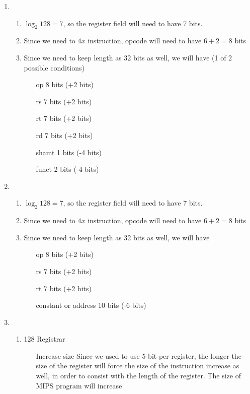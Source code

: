 \documentclass{article}
\def\math#1{$#1$}
\begin{document}
\begin{enumerate}[1)]
    \item \begin{enumerate}
        \item \math{\log_2 128 = 7}, so the register field will need to have 7 bits.
        \item Since we need to \math{4x} instruction, opcode will need to have \math{6 + 2 = 8} bits
        \item Since we need to keep length as 32 bits as well, we will have (1 of 2 possible conditions)
            \begin{itemize}
                \item [op] 8 bits (+2 bits)
                \item [rs] 7 bits (+2 bits)
                \item [rt] 7 bits (+2 bits)
                \item [rd] 7 bits (+2 bits)
                \item [shamt] 1 bits (-4 bits)
                \item [funct] 2 bits (-4 bits)
            \end{itemize}
        \end{enumerate}
    \item \begin{enumerate}
        \item \math{\log_2 128 = 7}, so the register field will need to have 7 bits.
        \item Since we need to \math{4x} instruction, opcode will need to have \math{6 + 2 = 8} bits
        \item Since we need to keep length as 32 bits as well, we will have 
            \begin{itemize}
                \item [op] 8 bits (+2 bits)
                \item [rs] 7 bits (+2 bits)
                \item [rt] 7 bits (+2 bits)
                \item [constant or address] 10 bits (-6 bits)
            \end{itemize}
        \end{enumerate}
    \item \begin{enumerate}
        \item 128 Registrar
            \begin{itemize}
                \item [Increase size] Since we used to use 5 bit per register, the longer the size of the register will force the size of the instruction increase as well, in order to consist with the length of the register. The size of MIPS program will increase

\end{itemize}
\end{enumerate}
\end{enumerate}
\end{document}
